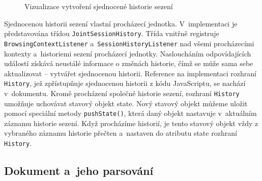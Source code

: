 \bigskip

\begin{figure}[H]
  \begin{center}
    \caption{Vizualizace vytvoření sjednocené historie sezení}
    \label{Figure.JointSessionHistory}
  \end{center}
\end{figure}

Sjednocenou historii sezení vlastní procházecí jednotka. V~implementaci je představována třídou \texttt{JointSessionHistory}. Třída vnitřně registruje \texttt{BrowsingContextListener} a~\texttt{SessionHistoryListener} nad všemi procházecími kontexty a~historiemi sezení procházecí jednotky. Nasloucháním odpovídajících událostí získává neustálé informace o změnách historie, čímž se může sama sebe aktualizovat -- vytvářet sjednocenou historii. Reference na implementaci rozhraní \texttt{History}, jež zpřístupňuje sjednocenou historii z kódu JavaScriptu, se nachází v~dokumentu. Kromě procházení společné historie sezení, rozhraní \texttt{History} umožňuje uchovávat stavový objekt state. Nový stavový objekt můžeme uložit pomocí speciální metody \texttt{pushState()}, která daný objekt nastavuje v~aktuálním záznamu historie sezení. Když procházíme historií, je tento stavový objekt vždy z vybraného záznamu historie přečten a~nastaven do atributu state rozhraní \texttt{History}.

\newpage

\subsection{Dokument a~jeho parsování}
\label{Chapter.Implementation.DocumentParsing}


